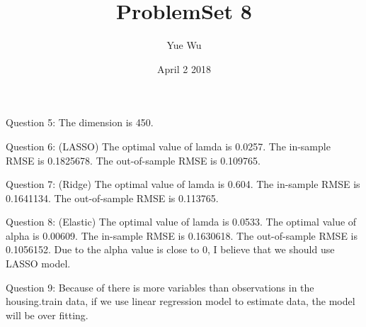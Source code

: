 \documentclass{article}
\title{ProblemSet 8}
\author{Yue Wu}
\date{April 2 2018}
\begin{document}
\maketitle

Question 5: The dimension is 450.

Question 6: (LASSO) The optimal value of lamda is 0.0257. The in-sample RMSE is 0.1825678. The out-of-sample RMSE is 0.109765.

Question 7: (Ridge) The optimal value of lamda is 0.604. The in-sample RMSE is 0.1641134. The out-of-sample RMSE is 0.113765.

Question 8: (Elastic) The optimal value of lamda is 0.0533. The optimal value of alpha is 0.00609. The in-sample RMSE is 0.1630618. The out-of-sample RMSE is 0.1056152.  Due to the alpha value is close to 0, I believe that we should use LASSO model. 

Question 9: Because of there is more variables than observations in the housing.train data, if we use linear regression model to estimate data, the model will be over fitting. 
\end{document}

